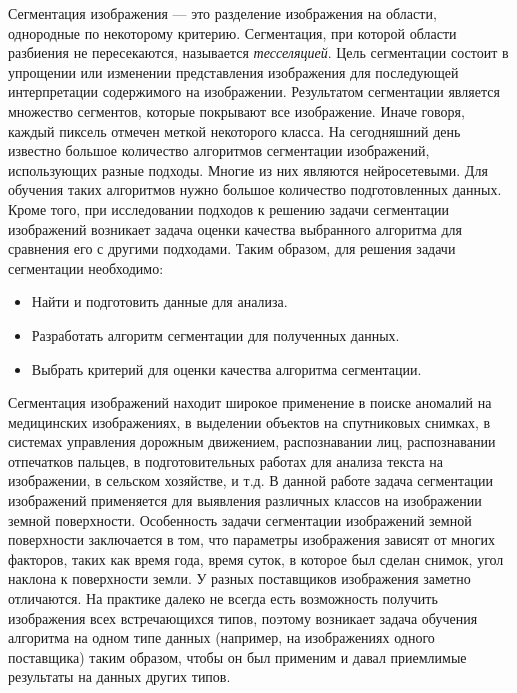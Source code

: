 Сегментация изображения --- это разделение изображения на области, однородные по
некоторому критерию. Сегментация, при которой области разбиения не пересекаются,
называется \textit{тесселяцией}. Цель сегментации состоит в упрощении или
изменении представления изображения для последующей интерпретации содержимого на
изображении.
Результатом сегментации является множество сегментов, которые
покрывают все изображение. Иначе говоря, каждый пиксель отмечен меткой
некоторого класса. На сегодняшний день известно большое количество алгоритмов
сегментации изображений, использующих разные подходы. Многие из них являются
нейросетевыми. Для обучения таких алгоритмов нужно большое количество
подготовленных данных. Кроме того, при исследовании подходов к решению задачи
сегментации изображений возникает задача оценки качества выбранного алгоритма
для сравнения его с другими подходами.  Таким образом, для решения задачи
сегментации необходимо:
\begin{itemize}
    \item Найти и подготовить данные для анализа.
    \item Разработать алгоритм сегментации для полученных данных.
    \item Выбрать критерий для оценки качества алгоритма сегментации.
\end{itemize}

Сегментация изображений находит широкое применение в поиске аномалий на
медицинских изображениях, в выделении объектов на спутниковых снимках, в
системах управления дорожным движением, распознавании лиц, распознавании
отпечатков пальцев, в подготовительных работах для анализа текста на
изображении, в сельском хозяйстве, и т.д.  В данной работе задача сегментации
изображений применяется для выявления различных классов на изображении земной
поверхности.  Особенность задачи сегментации изображений земной поверхности
заключается в том, что параметры изображения зависят от многих факторов, таких
как время года, время суток, в которое был сделан снимок, угол наклона к
поверхности земли. У разных поставщиков изображения заметно отличаются.  На
практике далеко не всегда есть возможность получить изображения всех
встречающихся типов, поэтому возникает задача обучения алгоритма на одном типе
данных (например, на изображениях одного поставщика) таким образом, чтобы он был
применим и давал приемлимые результаты на данных других типов.

\newpage
